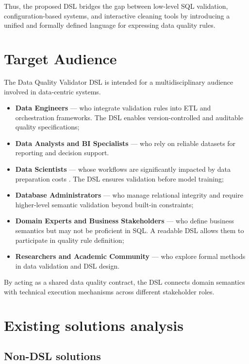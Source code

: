 Thus, the proposed DSL bridges the gap between low-level SQL validation,
configuration-based systems, and interactive cleaning tools by introducing a
unified and formally defined language for expressing data quality rules.

\section{Target Audience}

The Data Quality Validator DSL is intended for a multidisciplinary audience
involved in data-centric systems.
\begin{itemize}[label=-, noitemsep]
    \item \textbf{Data Engineers} --- who integrate validation rules into ETL and
          orchestration frameworks. The DSL enables version-controlled and
          auditable quality specifications;
    \item \textbf{Data Analysts and BI Specialists} --- who rely on reliable
          datasets for reporting and decision support.
    \item \textbf{Data Scientists} --- whose workflows are significantly impacted
          by data preparation costs \cite{chu2016datacleaning}. The DSL ensures
          validation before model training;
    \item \textbf{Database Administrators} --- who manage relational integrity
          and require higher-level semantic validation beyond built-in
          constraints;
    \item \textbf{Domain Experts and Business Stakeholders} --- who define
          business semantics but may not be proficient in SQL. A readable DSL
          allows them to participate in quality rule definition;
    \item \textbf{Researchers and Academic Community} --- who explore formal
          methods in data validation and DSL design.
\end{itemize}

By acting as a shared data quality contract, the DSL connects domain semantics
with technical execution mechanisms across different stakeholder roles.

\section{Existing solutions analysis}

\subsection{Non-DSL solutions}


